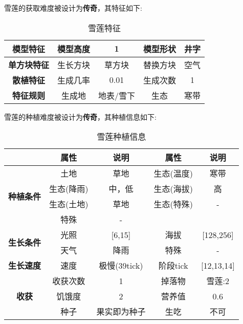 雪莲的获取难度被设计为\textbf{传奇}，其特征如下:
\begin{table}[H]
    \centering
    \caption{雪莲特征}
    \label{table:雪莲特征}
    \setlength{\tabcolsep}{4mm}
    \begin{tabular}{c|cc|cc}
        \toprule
        \textbf{模型特征}   & 模型高度 & 1      & 模型形状 & 井字     \\
        \midrule
        \textbf{单方块特征} & 生长方块 & 草方块 & 替换方块 & 空气     \\
        \midrule
        \textbf{散植特征}   & 生成几率 & 0.01   & 生成次数 & 1        \\
        \midrule
        \textbf{特征规则}   & 生成地   & 地表/雪下   & 生态     & 寒带 \\
        \bottomrule
    \end{tabular}
\end{table}


雪莲的种植难度被设计为\textbf{传奇}，其种植信息如下:

\begin{table}[H]
    \centering
    \caption{雪莲种植信息}
    \label{table:雪莲种植信息}
    \setlength{\tabcolsep}{4mm}
    \begin{tabular}{c|cc|cc}
        \toprule
                                           & \textbf{属性} & \textbf{说明} & \textbf{属性} & \textbf{说明} \\
        \midrule
        \multirow{4}{*}{\textbf{种植条件}} & 土地          & 草地          & 生态(温度)    & 寒带    \\
                                           & 生态(降雨)    & 中，低        & 生态(海拔)    & 高      \\
                                           & 生态(土地)    & 草地          & 生态(特殊)    & -         \\
                                           & 特殊          & -                \\
        \midrule
        \multirow{2}{*}{\textbf{生长条件}} & 光照          & [6,15]        & 海拔          & [128,256]      \\
                                           & 天气          & 降雨            & 特殊          & -             \\
        \midrule
        \textbf{生长速度}                  & 速度          & 极慢(39tick)     & 阶段tick      & [12,13,14]       \\
        \midrule
        \multirow{3}{*}{\textbf{收获}}     & 收获次数      & 1             & 掉落物        & 雪莲:2      \\
                                           & 饥饿度        & 2             & 营养值        & 0.6           \\
                                           & 种子          & 果实即为种子  & 生吃          & 不可 \\
        \bottomrule
    \end{tabular}
\end{table}

